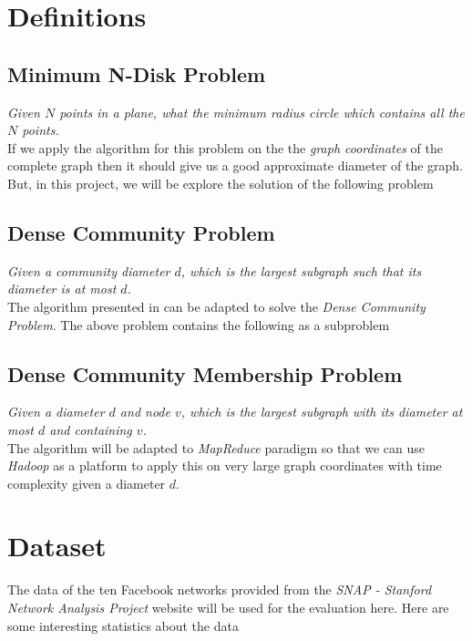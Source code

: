 \documentclass{article}
\begin{document}
    \section{Definitions}
        
        \subsection{Minimum N-Disk Problem}
            {\em Given $N$ points in a plane, what the minimum radius circle which contains all the $N$ points.} \\
        
        If we apply the algorithm for this problem on the the {\em graph coordinates} of the complete graph then it should give us a good approximate diameter of the graph. But, in this project, we will be explore the solution of the following problem
        
        \subsection{Dense Community Problem}
            {\em Given a community diameter $d$, which is the largest subgraph such that its diameter is at most $d$.} \\
        
        The algorithm presented in \cite{Efrat99} can be adapted to solve the {\em Dense Community Problem}. The above problem contains the following as a subproblem
        
        \subsection{Dense Community Membership Problem}
            {\em Given a diameter $d$ and node $v$, which is the largest subgraph with its diameter at most $d$ and containing $v$.} \\
        
        The algorithm will be adapted to {\em MapReduce} paradigm so that we can use {\em Hadoop} as a platform to apply this on very large graph coordinates with  time complexity given a diameter $d$.
        
    \section{Dataset}
    
        The data of the ten Facebook networks provided from the {\em SNAP - Stanford Network Analysis Project} website \cite{snap} will be used for the evaluation here. Here are some interesting statistics about the data
        
\end{document}
